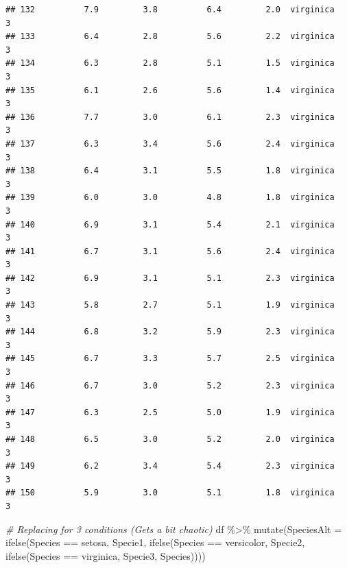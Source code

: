 \documentclass[
]{book}
\newenvironment{Shaded}{\begin{snugshade}}{\end{snugshade}}
\newcommand{\AttributeTok}[1]{\textcolor[rgb]{0.77,0.63,0.00}{#1}}
\newcommand{\CommentTok}[1]{\textcolor[rgb]{0.56,0.35,0.01}{\textit{#1}}}
\newcommand{\FunctionTok}[1]{\textcolor[rgb]{0.00,0.00,0.00}{#1}}
\newcommand{\NormalTok}[1]{#1}
\newcommand{\SpecialCharTok}[1]{\textcolor[rgb]{0.00,0.00,0.00}{#1}}
\newcommand{\StringTok}[1]{\textcolor[rgb]{0.31,0.60,0.02}{#1}}
\begin{document}
\begin{verbatim}
## 132          7.9         3.8          6.4         2.0  virginica          3
## 133          6.4         2.8          5.6         2.2  virginica          3
## 134          6.3         2.8          5.1         1.5  virginica          3
## 135          6.1         2.6          5.6         1.4  virginica          3
## 136          7.7         3.0          6.1         2.3  virginica          3
## 137          6.3         3.4          5.6         2.4  virginica          3
## 138          6.4         3.1          5.5         1.8  virginica          3
## 139          6.0         3.0          4.8         1.8  virginica          3
## 140          6.9         3.1          5.4         2.1  virginica          3
## 141          6.7         3.1          5.6         2.4  virginica          3
## 142          6.9         3.1          5.1         2.3  virginica          3
## 143          5.8         2.7          5.1         1.9  virginica          3
## 144          6.8         3.2          5.9         2.3  virginica          3
## 145          6.7         3.3          5.7         2.5  virginica          3
## 146          6.7         3.0          5.2         2.3  virginica          3
## 147          6.3         2.5          5.0         1.9  virginica          3
## 148          6.5         3.0          5.2         2.0  virginica          3
## 149          6.2         3.4          5.4         2.3  virginica          3
## 150          5.9         3.0          5.1         1.8  virginica          3
\end{verbatim}

\begin{Shaded}
\begin{Highlighting}[]
\CommentTok{\# Replacing for 3 conditions (Gets a bit chaotic)}
\NormalTok{df }\SpecialCharTok{\%\textgreater{}\%} 
  \FunctionTok{mutate}\NormalTok{(}\AttributeTok{SpeciesAlt =} \FunctionTok{ifelse}\NormalTok{(Species }\SpecialCharTok{==} \StringTok{\textquotesingle{}setosa\textquotesingle{}}\NormalTok{, }\StringTok{\textquotesingle{}Specie1\textquotesingle{}}\NormalTok{, }
                             \FunctionTok{ifelse}\NormalTok{(Species }\SpecialCharTok{==} \StringTok{\textquotesingle{}versicolor\textquotesingle{}}\NormalTok{, }\StringTok{\textquotesingle{}Specie2\textquotesingle{}}\NormalTok{,}
                                    \FunctionTok{ifelse}\NormalTok{(Species }\SpecialCharTok{==} \StringTok{\textquotesingle{}virginica\textquotesingle{}}\NormalTok{, }\StringTok{\textquotesingle{}Specie3\textquotesingle{}}\NormalTok{, Species))))}
\end{Highlighting}
\end{Shaded}
\end{document}

